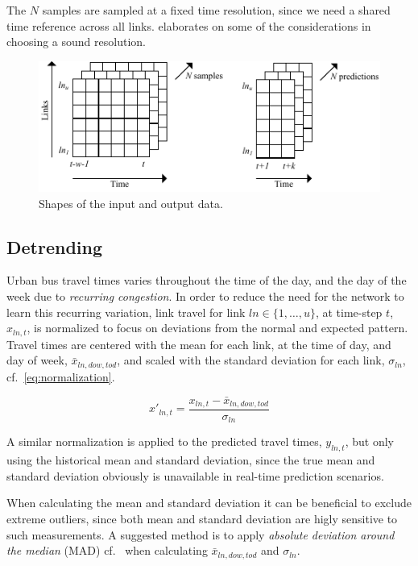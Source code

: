 \documentclass[preprint,11pt,5p,twocolumn]{elsarticle}
\begin{document}
The $N$ samples are sampled at a fixed time resolution, since we need a shared time reference across all links.  elaborates on some of the considerations in choosing a sound resolution.

\begin{figure}[!ht]
  \centering
  \includegraphics[scale=1.1]{drawings/data_shape.pdf}
  \caption{Shapes of the input and output data.}
  \label{fig:data_shape}
\end{figure}

\subsection{Detrending}
Urban bus travel times varies throughout the time of the day, and the day of the week due to \emph{recurring congestion}. In order to reduce the need for the network to learn this recurring variation, link travel for link $\mathit{ln} \in \{ 1,\ldots,u\}$, at time-step $t$, $x_{\mathit{ln},t}$, is normalized to focus on deviations from the normal and expected pattern. Travel times are centered with the mean for each link, at the time of day, and day of week, $\mathit{\bar{x}_{\mathit{ln},\mathit{dow},\mathit{tod}}}$, and scaled with the standard deviation for each link, $\sigma_\mathit{ln}$, cf.~\cref{eq:normalization}.

\begin{equation}
  x'_{\mathit{ln},t} = \frac{x_{\mathit{ln},t} - \bar{x}_{\mathit{ln},\mathit{dow},\mathit{tod}}}{\sigma_\mathit{ln}}
  \label{eq:normalization}
\end{equation}

A similar normalization is applied to the predicted travel times, $y_{\mathit{ln},t}$, but only using the historical mean and standard deviation, since the true mean and standard deviation obviously is unavailable in real-time prediction scenarios.

When calculating the mean and standard deviation it can be beneficial to exclude extreme outliers, since both mean and standard deviation are higly sensitive to such measurements. A suggested method is to apply \emph{absolute deviation around the median} (MAD) cf.~\cite{Olewuezi2011} when calculating $\mathit{\bar{x}_{\mathit{ln},\mathit{dow},\mathit{tod}}}$ and $\sigma_\mathit{ln}$.
\end{document}
